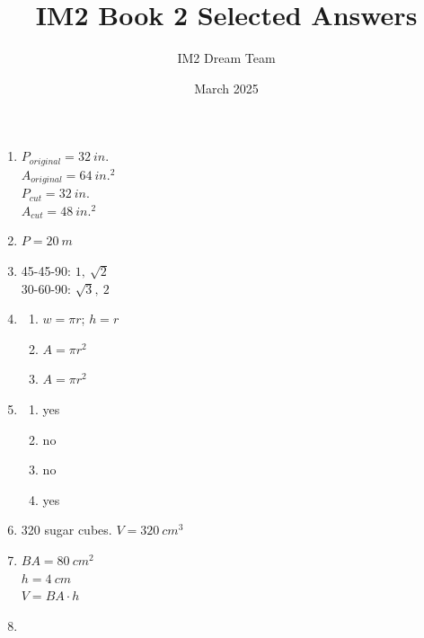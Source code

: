 \documentclass{article}
\title{IM2 Book 2 Selected Answers}
\author{IM2 Dream Team}
\date{March 2025}
\begin{document}
\maketitle

\begin{enumerate}

\item $P_{original} = 32 \ in.$ \\
	$A_{original} = 64 \ in.^2$ \\
	$P_{cut} = 32 \ in.$ \\
	$A_{cut} = 48 \ in.^2$
	
\item $P = 20 \ m$

\item 45-45-90: $1, \ \sqrt{2}$ \\
	30-60-90: $\sqrt{3}, \ 2$
	
\item

	\begin{enumerate}
	
	\item $w = \pi r$; $h = r$
	
	\item $A = \pi r^2$
	
	\item $A = \pi r^2$
	
	\end{enumerate}
	
\item

	\begin{enumerate}
	
	\item yes
	
	\item no
	
	\item no
	
	\item yes
	
	\end{enumerate}
	
\item 320 sugar cubes. $V = 320 \ cm^3$

\item $BA = 80 \ cm^2$ \\
	$h = 4 \ cm$ \\
	$V = BA \cdot h$
	
\item


\end{enumerate}
\end{document}
